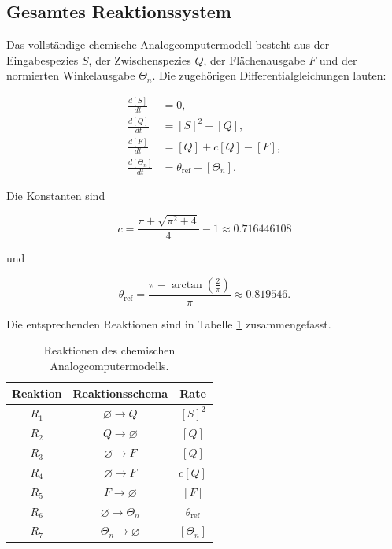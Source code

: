 \subsection{Gesamtes Reaktionssystem}

Das vollständige chemische Analogcomputermodell besteht aus der
Eingabespezies \(S\), der Zwischenspezies \(Q\), der Flächenausgabe \(F\)
und der normierten Winkelausgabe \(\Theta_n\). Die zugehörigen
Differentialgleichungen lauten:

\begin{align}
    \frac{d[S]}{dt}
    &=
    0,
    \label{eq:gesamt_S}
    \\
    \frac{d[Q]}{dt}
    &=
    [S]^2-[Q],
    \label{eq:gesamt_Q}
    \\
    \frac{d[F]}{dt}
    &=
    [Q]+c[Q]-[F],
    \label{eq:gesamt_F}
    \\
    \frac{d[\Theta_n]}{dt}
    &=
    \theta_{\mathrm{ref}}-[\Theta_n].
    \label{eq:gesamt_theta}
\end{align}

Die Konstanten sind

\begin{equation}
    c
    =
    \frac{\pi+\sqrt{\pi^2+4}}{4}-1
    \approx
    0.716446108
\end{equation}

und

\begin{equation}
    \theta_{\mathrm{ref}}
    =
    \frac{
        \pi-\arctan\left(\frac{2}{\pi}\right)
    }{\pi}
    \approx
    0.819546.
\end{equation}

Die entsprechenden Reaktionen sind in Tabelle \ref{tab:reaktionen}
zusammengefasst.

\begin{table}[h]
    \centering
    \begin{tabular}{c|c|c}
        Reaktion & Reaktionsschema & Rate \\
        \hline
        \(R_1\) & \(\varnothing \rightarrow Q\) & \([S]^2\) \\
        \(R_2\) & \(Q \rightarrow \varnothing\) & \([Q]\) \\
        \(R_3\) & \(\varnothing \rightarrow F\) & \([Q]\) \\
        \(R_4\) & \(\varnothing \rightarrow F\) & \(c[Q]\) \\
        \(R_5\) & \(F \rightarrow \varnothing\) & \([F]\) \\
        \(R_6\) & \(\varnothing \rightarrow \Theta_n\) & \(\theta_{\mathrm{ref}}\) \\
        \(R_7\) & \(\Theta_n \rightarrow \varnothing\) & \([\Theta_n]\) \\
    \end{tabular}
    \caption{Reaktionen des chemischen Analogcomputermodells.}
    \label{tab:reaktionen}
\end{table}

